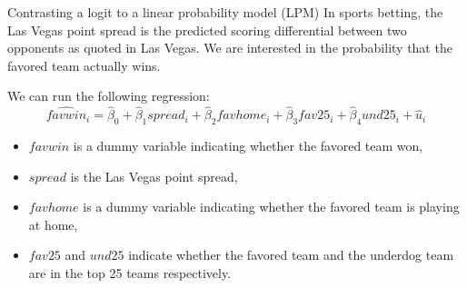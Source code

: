 \documentclass[
  ignorenonframetext,
]{beamer}
\begin{document}
\begin{frame}{Contrasting a logit to a linear probability model (LPM)}
\protect\hypertarget{contrasting-a-logit-to-a-linear-probability-model-lpm}{}
In sports betting, the Las Vegas point spread is the predicted scoring
differential between two opponents as quoted in Las Vegas. We are
interested in the probability that the favored team actually wins.

We can run the following regression: \[
\widehat{favwin}_i=\hat{\beta}_0+\hat{\beta}_1spread_i+\hat{\beta}_2favhome_i+\hat{\beta}_3fav25_i+\hat{\beta}_4und25_i+\hat{u}_i
\]

\begin{itemize}
\item
  \(favwin\) is a dummy variable indicating whether the favored team
  won,
\item
  \(spread\) is the Las Vegas point spread,
\item
  \(favhome\) is a dummy variable indicating whether the favored team is
  playing at home,
\item
  \(fav25\) and \(und25\) indicate whether the favored team and the
  underdog team are in the top 25 teams respectively.
\end{itemize}
\end{frame}
\end{document}
